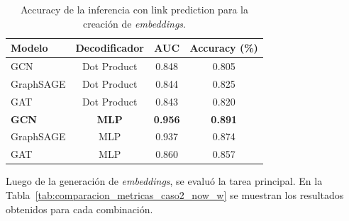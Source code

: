 \begin{table}[H]
\centering
\begin{tabular}{lccc}
\hline
\textbf{Modelo} & \textbf{Decodificador} & \textbf{AUC}& \textbf{Accuracy (\%)} \\
\hline
GCN & Dot Product & 0.848  & 0.805 \\
GraphSAGE & Dot Product & 0.844 & 0.825 \\
GAT & Dot Product & 0.843 & 0.820 \\
\textbf{GCN} & \textbf{MLP} & \textbf{0.956} &  \textbf{0.891} \\
GraphSAGE & MLP &  0.937 & 0.874 \\
GAT & MLP & 0.860 & 0.857 \\
\hline
\end{tabular}
\caption{Accuracy de la inferencia con link prediction para la creación de \textit{embeddings}.}
\label{tab:comparacion_accuracy_caso2_t}
\end{table}



Luego de la generación de \textit{embeddings}, se evaluó la tarea principal. En la Tabla~\ref{tab:comparacion_metricas_caso2_now_w} se muestran los resultados obtenidos para cada combinación.\\


\begin{table}[H]
\centering
{}
\caption{Resultados de Precision, Recall y Accuracy (\%) por combinación de encoder y decoder bajo dos configuraciones: sin batching y sin balanceo (`NoBatch-NoW'), y sin batching con balanceo (`NoBatch-W'). En negrita se indican los mejores resultados por métrica.}
\label{tab:comparacion_metricas_caso2_now_w}
\end{table}


